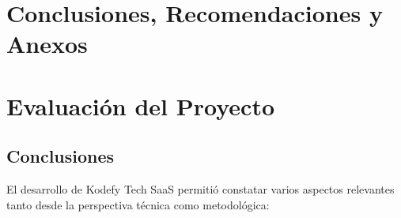 \documentclass[12pt, a4paper]{article}
\begin{document}
\newpage
\section*{Conclusiones, Recomendaciones y Anexos}

\section{Evaluación del Proyecto}

\subsection{Conclusiones}

El desarrollo de Kodefy Tech SaaS permitió constatar varios aspectos relevantes tanto desde la perspectiva técnica como metodológica:
\end{document}
